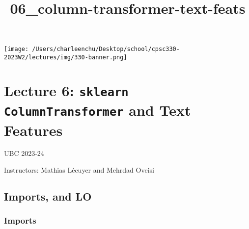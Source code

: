 \documentclass[11pt]{article}
\title{06\_column-transformer-text-feats}
\begin{document}
    
    \maketitle
    
    

    
    \texttt{[image: /Users/charleenchu/Desktop/school/cpsc330-2023W2/lectures/img/330-banner.png]}

    \section{\texorpdfstring{Lecture 6: \texttt{sklearn}
\texttt{ColumnTransformer} and Text
Features}{Lecture 6: sklearn ColumnTransformer and Text Features}}\label{lecture-6-sklearn-columntransformer-and-text-features}

UBC 2023-24

Instructors: Mathias Lécuyer and Mehrdad Oveisi

    \subsection{Imports, and LO}\label{imports-and-lo}

    \subsubsection{Imports}\label{imports}
\end{document}
